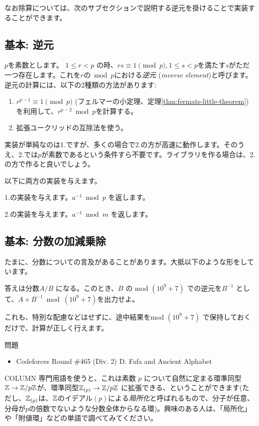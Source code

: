 \documentclass{jsarticle}
\begin{document}
  なお除算については、次のサブセクションで説明する逆元を掛けることで実装することができます。
  \subsection{基本: 逆元}
  \label{subsec:inverse-element}
  $p$を素数とします。
  $1 \le r < p$ の時、$rs \equiv 1 \pmod p, 1 \le s < p$を満たす$s$がただ一つ存在します。これを$r$の${} \bmod p$における\emph{逆元} (\emph{inverse element})と呼びます。
  逆元の計算には、以下の2種類の方法があります:
  \begin{enumerate}
   \item $r^{p-1} \equiv 1 \pmod p$ (フェルマーの小定理、定理\ref{thm:fermats-little-theorem})を利用して、$r^{p-2} \bmod p$を計算する。
   \item 拡張ユークリッドの互除法を使う。
  \end{enumerate}
  実装が単純なのは1.ですが、多くの場合で2.の方が高速に動作します。そのうえ、2.では$p$が素数であるという条件すら不要です。ライブラリを作る場合は、2.の方で作ると良いでしょう。

  以下に両方の実装を与えます。

  1.の実装を与えます。$a^{-1} \bmod p$ を返します。
  

  2.の実装を与えます。$a^{-1} \bmod m$ を返します。
  

  \subsection{基本: 分数の加減乗除}
  \label{subsec:operations-on-fractions}
  たまに、分数についての言及があることがあります。大抵以下のような形をしています。
  \begin{center}
   答えは分数$A/B$ になる。このとき、$B$ の mod $(10^9+7)$ での逆元を$B^{-1}$ として、$A \times B^{-1} \bmod (10^9 + 7)$を出力せよ。
  \end{center}
  これも、特別な配慮などはせずに、途中結果をmod $(10^9+7)$ で保持しておくだけで、計算が正しく行えます。
  \begin{itembox}[l]{問題}
   \begin{itemize}
    \item Codeforces Round \#465 (Div. 2) D. Fafa and Ancient Alphabet
   \end{itemize}
  \end{itembox}
  \begin{itembox}[l]{COLUMN}
   専門用語を使うと、これは素数 $p$ について自然に定まる環準同型$\mathbb{Z} \to \mathbb{Z}/p\mathbb{Z}$が、環準同型$\mathbb{Z}_{(p)} \to \mathbb{Z}/p\mathbb{Z}$ に拡張できる、ということができます(ただし、$\mathbb{Z}_{(p)}$は、$\mathbb{Z}$のイデアル$(p)$による\emph{局所化}と呼ばれるもので、分子が任意、分母が$p$の倍数でないような分数全体からなる環)。興味のある人は、「局所化」や「附値環」などの単語で調べてみてください。
  \end{itembox}
\end{document}
